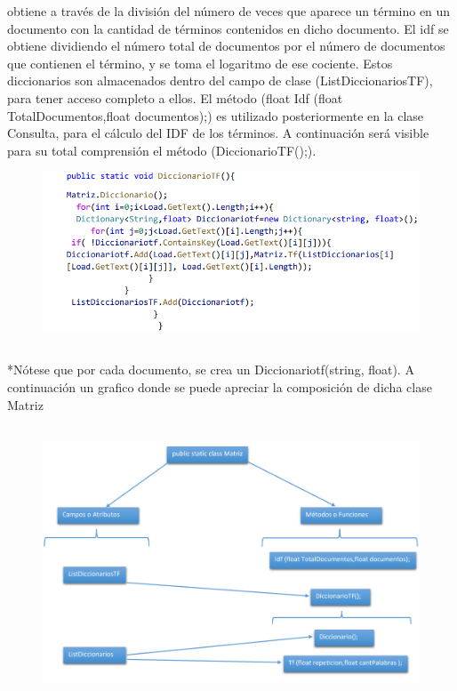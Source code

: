 \documentclass[a4paper,12pt]{article}
\begin{document}
obtiene a través de la división del número de veces que aparece un término en un 
documento con la cantidad de términos contenidos en dicho documento. El idf se obtiene 
dividiendo el número total de documentos por el número de documentos que contienen el 
término, y se toma el logaritmo de ese cociente. Estos diccionarios son almacenados dentro 
del campo de clase (ListDiccionariosTF), para tener acceso completo a ellos. El método (float 
Idf (float TotalDocumentos,float documentos);) es utilizado posteriormente en la clase 
Consulta, para el cálculo del IDF de los términos. A continuación será visible para su total 
comprensión el método (DiccionarioTF();).
\begin{figure}[h]
    \includegraphics*{code 2.png}
    \end{figure}
\subsection*{}
*Nótese que por cada documento, se crea un Diccionariotf(string, float).
\linebreak
\linebreak
A continuación un grafico donde se puede apreciar la composición de dicha clase Matriz
\subsection*{}
\begin{figure}[h] 
    \includegraphics*[width=17cm]{grafico 3.png}
    
\end{figure}
\end{document}
